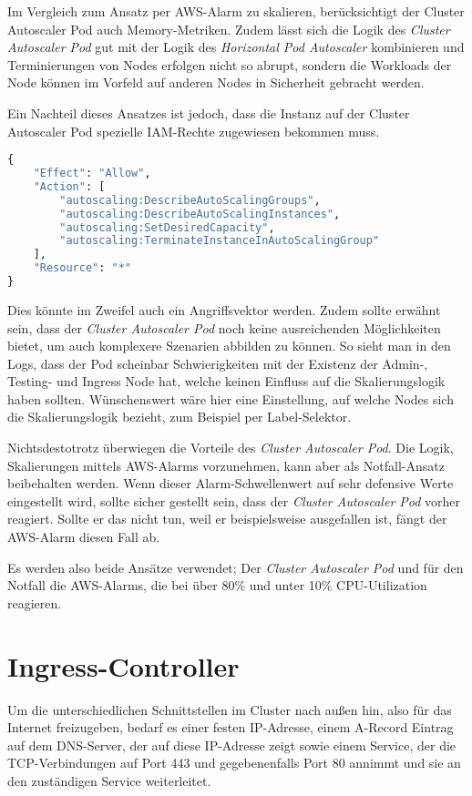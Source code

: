 Im Vergleich zum Ansatz per AWS-Alarm zu skalieren, berücksichtigt der Cluster
Autoscaler Pod auch Memory-Metriken.
Zudem lässt sich die Logik des \emph{Cluster Autoscaler Pod} gut mit der Logik des
\emph{Horizontal Pod Autoscaler} kombinieren und Terminierungen
von Nodes erfolgen
nicht so abrupt, sondern die Workloads der Node können im Vorfeld auf anderen
Nodes in Sicherheit gebracht werden.

Ein Nachteil dieses Ansatzes ist jedoch, dass die Instanz auf der Cluster
Autoscaler Pod spezielle IAM-Rechte zugewiesen bekommen muss.
\begin{lstlisting}[language=Python,numbers=none]
{
    "Effect": "Allow",
    "Action": [
        "autoscaling:DescribeAutoScalingGroups",
        "autoscaling:DescribeAutoScalingInstances",
        "autoscaling:SetDesiredCapacity",
        "autoscaling:TerminateInstanceInAutoScalingGroup"
    ],
    "Resource": "*"
}\end{lstlisting}

Dies könnte im Zweifel auch ein Angriffsvektor werden. Zudem sollte
erwähnt sein, dass der
\emph{Cluster Autoscaler Pod} noch keine ausreichenden
Möglichkeiten bietet,
um auch komplexere Szenarien abbilden zu können.
So sieht man in den Logs, dass der Pod scheinbar Schwierigkeiten mit der Existenz
der Admin-, Testing- und Ingress Node hat, welche keinen Einfluss auf die
Skalierungslogik haben sollten.
Wünschenswert wäre hier eine Einstellung, auf welche Nodes sich die
Skalierungslogik
bezieht, zum Beispiel per Label-Selektor.

Nichtsdestotrotz überwiegen die Vorteile des \emph{Cluster Autoscaler Pod}.
Die Logik, Skalierungen mittels AWS-Alarms vorzunehmen, kann aber als
Notfall-Ansatz beibehalten werden. Wenn dieser Alarm-Schwellenwert
auf sehr defensive
Werte eingestellt wird, sollte sicher gestellt sein, dass der
\emph{Cluster Autoscaler Pod} vorher reagiert. Sollte er das nicht tun, weil er
beispielsweise ausgefallen ist,
fängt der AWS-Alarm diesen Fall ab.

Es werden also beide Ansätze verwendet; Der \emph{Cluster Autoscaler Pod} und
für den Notfall
die AWS-Alarms, die bei über 80\% und unter 10\% CPU-Utilization reagieren.

\section{Ingress-Controller}

Um die unterschiedlichen Schnittstellen im Cluster nach außen hin, also für das
Internet freizugeben, bedarf es einer festen IP-Adresse, einem A-Record
Eintrag auf dem
DNS-Server, der auf diese IP-Adresse zeigt sowie einem Service, der die
TCP-Verbindungen auf Port 443 und
gegebenenfalls Port 80 annimmt und sie an den zuständigen Service weiterleitet.

